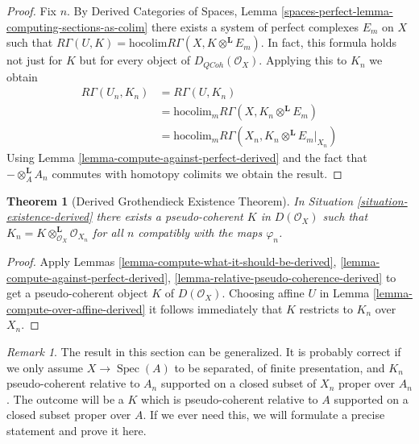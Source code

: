 \documentclass{stacks-project}
\theoremstyle{plain}
\newtheorem{theorem}[subsection]{Theorem}
\theoremstyle{definition}
\theoremstyle{remark}
\newtheorem{remark}[subsection]{Remark}
\numberwithin{equation}{subsection}
\def\Spec{\mathop{\mathrm{Spec}}}
\def\QCoh{\mathit{QCoh}}
\begin{document}
\begin{proof}
Fix $n$. By Derived Categories of Spaces, Lemma
\ref{spaces-perfect-lemma-computing-sections-as-colim}
there exists a system of perfect complexes $E_m$
on $X$ such that
$R\Gamma(U, K) = \text{hocolim} R\Gamma(X, K \otimes^\mathbf{L} E_m)$.
In fact, this formula holds not just for $K$ but for every object of
$D_\QCoh(\mathcal{O}_X)$.
Applying this to $K_n$
we obtain
\begin{align*}
R\Gamma(U_n, K_n)
& =
R\Gamma(U, K_n) \\
& =
\text{hocolim}_m R\Gamma(X, K_n \otimes^\mathbf{L} E_m) \\
& =
\text{hocolim}_m R\Gamma(X_n, K_n \otimes^\mathbf{L} E_m|_{X_n})
\end{align*}
Using Lemma \ref{lemma-compute-against-perfect-derived}
and the fact that $- \otimes_A^\mathbf{L} A_n$
commutes with homotopy colimits we obtain the result.
\end{proof}

\begin{theorem}[Derived Grothendieck Existence Theorem]
\label{theorem-existence-derived}
In Situation \ref{situation-existence-derived}
there exists a pseudo-coherent $K$ in $D(\mathcal{O}_X)$
such that $K_n = K \otimes_{\mathcal{O}_X}^\mathbf{L} \mathcal{O}_{X_n}$
for all $n$ compatibly with the maps $\varphi_n$.
\end{theorem}

\begin{proof}
Apply Lemmas \ref{lemma-compute-what-it-should-be-derived},
\ref{lemma-compute-against-perfect-derived},
\ref{lemma-relative-pseudo-coherence-derived}
to get a pseudo-coherent object $K$ of $D(\mathcal{O}_X)$.
Choosing affine $U$ in Lemma
\ref{lemma-compute-over-affine-derived}
it follows immediately that $K$ restricts to $K_n$ over $X_n$.
\end{proof}

\begin{remark}
\label{remark-correct-generality}
The result in this section can be generalized. It is probably correct
if we only assume $X \to \Spec(A)$ to be separated, of finite presentation,
and $K_n$ pseudo-coherent relative to $A_n$ supported on a closed
subset of $X_n$ proper over $A_n$. The outcome will be a $K$ which
is pseudo-coherent relative to $A$ supported on a closed subset
proper over $A$. If we ever need this, we will
formulate a precise statement and prove it here.
\end{remark}















\end{document}
